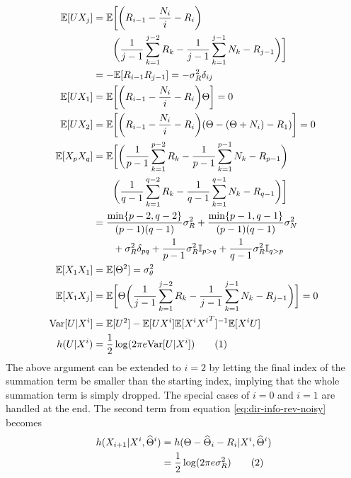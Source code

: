 \documentclass[letterpaper, 10pt, conference]{ieeeconf}
\newcommand\numberthis{\stepcounter{equation}\tag{\theequation}}
\begin{document}
\begin{align*}
	\mathbb{E}[U X_j] &= \mathbb{E} \bigg[ \bigg( R_{i-1} - \frac{N_i}{i} - R_i \bigg) \\
					  & \qquad             \bigg( \frac{1}{j-1} \sum_{k=1}^{j-2} R_k - \frac{1}{j-1} \sum_{k=1}^{j-1} N_k - R_{j-1} \bigg) \bigg] \\
					  &= - \mathbb{E}[R_{i-1} R_{j-1}] = - \sigma_R^2 \delta_{ij} \\
	\mathbb{E}[U X_1] &= \mathbb{E} \bigg[ \bigg( R_{i-1} - \frac{N_i}{i} - R_i \bigg) \Theta \bigg] = 0 \; \\
	\mathbb{E}[U X_2] &= \mathbb{E} \bigg[ \bigg( R_{i-1} - \frac{N_i}{i} - R_i \bigg) (\Theta - (\Theta + N_i) - R_1) \bigg] = 0 \; \\
	\mathbb{E}[X_p X_q] &= \mathbb{E} \bigg[ \bigg( \frac{1}{p-1} \sum_{k=1}^{p-2} R_k - \frac{1}{p-1} \sum_{k=1}^{p-1} N_k - R_{p-1} \bigg) \\
						& \qquad             \bigg( \frac{1}{q-1} \sum_{k=1}^{q-2} R_k - \frac{1}{q-1} \sum_{k=1}^{q-1} N_k - R_{q-1} \bigg) \bigg] \\
					    &= \frac{\min\{p-2, q-2\}}{(p-1)(q-1)} \sigma_R^2 + \frac{\min\{p-1, q-1\}}{(p-1)(q-1)} \sigma_N^2 \\
						& \qquad + \sigma_R^2 \delta_{pq} + \frac{1}{p-1} \sigma_R^2 \mathbb{I}_{p>q} + \frac{1}{q-1} \sigma_R^2 \mathbb{I}_{q>p} \\
	\mathbb{E}[X_1 X_1] &= \mathbb{E}[\Theta^2] = \sigma_\theta^2 \\
	\mathbb{E}[X_1 X_j] &= \mathbb{E} \bigg[ \Theta \bigg( \frac{1}{j-1} \sum_{k=1}^{j-2} R_k - \frac{1}{j-1} \sum_{k=1}^{j-1} N_k - R_{j-1} \bigg) \bigg] = 0 \\
	\text{Var}[U|X^i] &= \mathbb{E}[U^2] - \mathbb{E}[U X^i] \mathbb{E}[X^i {X^i}^T]^{-1} \mathbb{E}[X^i U] \\
	h(U | X^i) &= \frac{1}{2}\log(2 \pi e \text{Var}[U | X^i]) \numberthis \label{eq:h_x_x-noisy}
\end{align*}
The above argument can be extended to $i=2$ by letting the final index of the summation term be smaller than the starting index, implying that the whole summation term is simply dropped. The special cases of $i=0$ and $i=1$ are handled at the end. The second term from equation \eqref{eq:dir-info-rev-noisy} becomes
\begin{align*}
	h(X_{i+1} | X^i, \widehat\Theta^i) &= h(\Theta - \widehat\Theta_i - R_i | X^i, \widehat\Theta^i) \\
									   &= \frac{1}{2}\log(2 \pi e \sigma_R^2) \numberthis \label{eq:h_x_x_theta-noisy}
\end{align*}
\end{document}
